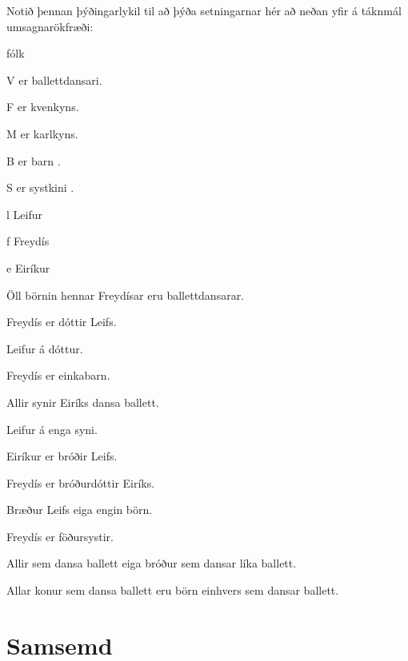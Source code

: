 \problempart
\label{pr.FOLballet}
Notið þennan þýðingarlykil til að þýða setningarnar hér að neðan yfir á táknmál umsagnarökfræði:
\begin{ekey}
\item[\text{yfirgrip}] fólk
\item[V]  er ballettdansari.
\item[F]  er kvenkyns.
\item[M]  er karlkyns.
\item[B]  er barn .
\item[S]  er systkini .
\item[l] Leifur
\item[f] Freydís
\item[e] Eiríkur
\end{ekey}
\begin{earg}
\item Öll börnin hennar Freydísar eru ballettdansarar.
\item Freydís er dóttir Leifs.
\item Leifur á dóttur.
\item Freydís er einkabarn.
\item Allir synir Eiríks dansa ballett.
\item Leifur á enga syni.
\item Eiríkur er bróðir Leifs.
\item Freydís er bróðurdóttir Eiríks.
\item Bræður Leifs eiga engin börn.
\item Freydís er föðursystir. 
\item Allir sem dansa ballett eiga bróður sem dansar líka ballett.
\item Allar konur sem dansa ballett eru börn einhvers sem dansar ballett.
\end{earg}

\chapter{Samsemd}
\label{sec.identity}

